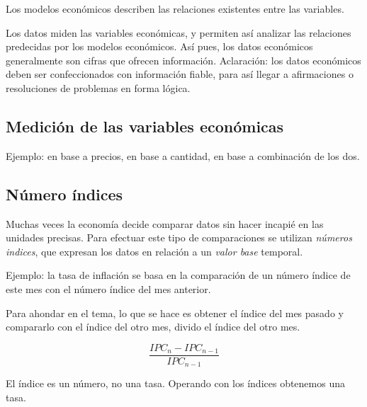 Los modelos económicos describen las relaciones existentes entre las variables.

Los datos miden las variables económicas,
y permiten así analizar las relaciones predecidas por los modelos económicos.
Así pues,
los datos económicos generalmente son cifras que ofrecen información.
Aclaración: los datos económicos deben ser confeccionados con información fiable,
para así llegar a afirmaciones o resoluciones de problemas en forma lógica.

\subsection{Medición de las variables económicas}

Ejemplo: en base a precios,
en base a cantidad,
en base a combinación de los dos.

\subsection{Número índices}

Muchas veces la economía decide comparar datos sin hacer incapié en las unidades precisas.
Para efectuar este tipo de comparaciones se utilizan \textit{números indices},
que expresan los datos en relación a un \textit{valor base} temporal.

Ejemplo: la tasa de inflación se basa en la comparación de un número índice de este mes con 
el número índice del mes anterior.

Para ahondar en el tema, lo que se hace es 
obtener el índice del mes pasado y compararlo con el índice del otro mes,
divido el índice del otro mes.

\begin{equation*}
    \frac{IPC_{n} - IPC_{n-1}}{IPC_{n-1}}
\end{equation*}

El índice es un número, no una tasa.
Operando con los índices obtenemos una tasa.